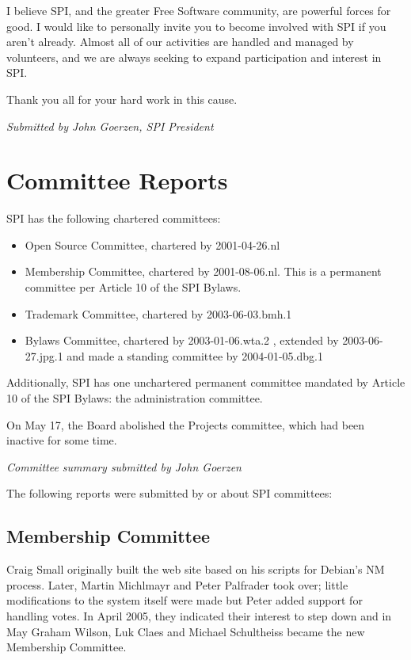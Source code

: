 \documentclass[letterpaper]{report}
\begin{document}
I believe SPI, and the greater Free Software community, are powerful forces
for good. I would like to personally invite you to become involved with SPI
if you aren't already. Almost all of our activities are handled and managed
by volunteers, and we are always seeking to expand participation and
interest in SPI.

Thank you all for your hard work in this cause.

\emph{Submitted by John Goerzen, SPI President}

\chapter{Committee Reports}

SPI has the following chartered committees:

\begin{itemize}

\item Open Source Committee, chartered by 2001-04-26.nl
\item Membership Committee, chartered by 2001-08-06.nl. This is a permanent committee per Article 10 of
the SPI Bylaws.
\item Trademark Committee, chartered by 2003-06-03.bmh.1
\item Bylaws Committee, chartered by 2003-01-06.wta.2 , extended by 2003-06-27.jpg.1 and made a standing
committee by 2004-01-05.dbg.1

\end{itemize}

Additionally, SPI has one unchartered permanent committee mandated by
Article 10 of the SPI Bylaws: the administration committee.

On May 17, the Board abolished the Projects committee, which had been
inactive for some time.

\emph{Committee summary submitted by John Goerzen}

\vspace{1em}

The following reports were submitted by or about SPI committees:

\section{Membership Committee}

Craig Small originally built the web site based on his scripts for Debian's
NM process. Later, Martin Michlmayr and Peter Palfrader took over; little
modifications to the system itself were made but Peter added support for
handling votes. In April 2005, they indicated their interest to step down
and in May Graham Wilson, Luk Claes and Michael Schultheiss became the new
Membership Committee.
\end{document}
